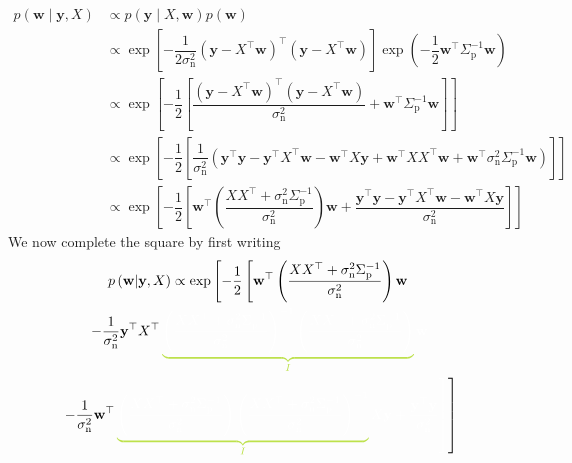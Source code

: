 \documentclass[11pt]{report} %
\begin{document}
\begin{align}
p\left(\mathbf{w}\middle|\mathbf{y},X\right) &\propto p\left(\mathbf{y}\middle|X,\mathbf{w}\right)p\left(\mathbf{w}\right) \\
&\propto \exp\left[-\dfrac{1}{2\sigma_{\mathrm{n}}^{2}}\left(\mathbf{y}-X^{\top}\mathbf{w}\right)^{\top}\left(\mathbf{y}-X^{\top}\mathbf{w}\right)\right]\exp\left(-\dfrac{1}{2}\mathbf{w}^{\top}\Sigma_{\mathrm{p}}^{-1}\mathbf{w}\right) \\
&\propto \exp\left[-\dfrac{1}{2}\left[\dfrac{\left(\mathbf{y}-X^{\top}\mathbf{w}\right)^{\top}\left(\mathbf{y}-X^{\top}\mathbf{w}\right)}{\sigma_{\mathrm{n}}^{2}}+\mathbf{w}^{\top}\Sigma_{\mathrm{p}}^{-1}\mathbf{w}\right]\right] \\
&\propto \exp\left[-\dfrac{1}{2}\left[\dfrac{1}{\sigma_{\mathrm{n}}^{2}}\left(\mathbf{y}^{\top}\mathbf{y}-\mathbf{y}^{\top}X^{\top}\mathbf{w}-\mathbf{w}^{\top}X\mathbf{y}+\mathbf{w}^{\top}XX^{\top}\mathbf{w}+\mathbf{w}^{\top}\sigma_{\mathrm{n}}^{2}\Sigma_{\mathrm{p}}^{-1}\mathbf{w}\right)\right]\right] \\
&\propto \exp\left[-\dfrac{1}{2}\left[\mathbf{w}^{\top}\left(\dfrac{XX^{\top}+\sigma_{\mathrm{n}}^{2}\Sigma_{\mathrm{p}}^{-1}}{\sigma_{\mathrm{n}}^{2}}\right)\mathbf{w}+\dfrac{\mathbf{y}^{\top}\mathbf{y}-\mathbf{y}^{\top}X^{\top}\mathbf{w}-\mathbf{w}^{\top}X\mathbf{y}}{\sigma_{\mathrm{n}}^{2}}\right]\right]
\end{align}
We now complete the square by first writing
\begin{multline}
p\left(\mathbf{w}\middle|\mathbf{y},X\right) \propto \exp\left[-\dfrac{1}{2}\left[\mathbf{w}^{\top}\left(\dfrac{XX^{\top}+\sigma_{\mathrm{n}}^{2}\Sigma_{\mathrm{p}}^{-1}}{\sigma_{\mathrm{n}}^{2}}\right)\mathbf{w}\right.\right. \\
-\dfrac{1}{\sigma_{\mathrm{n}}^{2}}\mathbf{y}^{\top}X^{\top}\green\underbrace{\black\left(\dfrac{XX^{\top}+\sigma_{\mathrm{n}}^{2}\Sigma_{\mathrm{p}}^{-1}}{\sigma_{\mathrm{n}}^{2}}\right)^{-1}\left(\dfrac{XX^{\top}+\sigma_{\mathrm{n}}^{2}\Sigma_{\mathrm{p}}^{-1}}{\sigma_{\mathrm{n}}^{2}}\right)}_{\green I}\black\mathbf{w} \\ 
\left.\left.-\dfrac{1}{\sigma_{\mathrm{n}}^{2}}\mathbf{w}^{\top}\green\underbrace{\black \left(\dfrac{XX^{\top}+\sigma_{\mathrm{n}}^{2}\Sigma_{\mathrm{p}}^{-1}}{\sigma_{\mathrm{n}}^{2}}\right)\left(\dfrac{XX^{\top}+\sigma_{\mathrm{n}}^{2}\Sigma_{\mathrm{p}}^{-1}}{\sigma_{\mathrm{n}}^{2}}\right)^{-1}}_{\green I}\black X\mathbf{y}+\dfrac{\mathbf{y}^{\top}\mathbf{y}}{\sigma_{\mathrm{n}}^{2}}\right]\right]
\end{multline}
\end{document}
